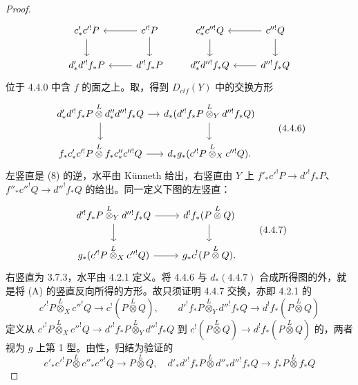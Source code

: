 \begin{proof}
\[\begin{tikzcd}c'_*c'^!P\arrow[d]&c'^!P\arrow[l]\arrow[d]\\ d'_*d'^!f_*P&d'^!f_*P\arrow[l]\end{tikzcd}\qquad\begin{tikzcd}c''_*c''^!Q\arrow[d]&c''^!Q\arrow[l]\arrow[d]\\ d''_*d''^!f_*Q&d''^!f_*Q\arrow[l]\end{tikzcd}\]
位于 4.4.0 中含 $f$ 的面之上。取，得到 $D_{ctf}(Y)$ 中的交换方形
\[\begin{tikzcd}[column sep=small]
d'_*d'^!f_*P\mathbin{\overset L\otimes}d''_*d''^!f_*Q\arrow[r]\arrow[d]&d_*(d'^!f_*P\mathbin{\overset L\otimes}_Yd''^!f_*Q)\arrow[d]\\ f_*c'_*c'^!P\mathbin{\overset L\otimes}f_*c''_*c''^!Q\arrow[r]&d_*g_*(c'^!P\mathbin{\overset L\otimes}_Xc''^!Q).
\end{tikzcd}\tag{4.4.6}\]
左竖直是 (8) 的逆，水平由 Künneth 给出，右竖直由 $Y$ 上 $f'_*c'^!P\to d'^!f_*P$、$f''_*c''^!Q\to d''^!f_*Q$ 的给出。同一定义下图的左竖直：
\[\begin{tikzcd}
d'^!f_*P\mathbin{\overset L\otimes}_Yd''^!f_*Q\arrow[r]\arrow[d]&d^!f_*(P\mathbin{\overset L\otimes}Q)\arrow[d]\\g_*(c'^!P\mathbin{\overset L\otimes}_Xc''^!Q)\arrow[r]&g_*c^!(P\mathbin{\overset L\otimes}Q).
\end{tikzcd}\tag{4.4.7}\]
右竖直为 3.7.3，水平由 4.2.1 定义。将 4.4.6 与 $d_*(4.4.7)$ 合成所得图的外，就是将 (A) 的竖直反向所得的方形。故只须证明 4.4.7 交换，亦即 4.2.1 的
\[c'^!P\mathbin{\overset L\otimes}_Xc''^!Q\to c^!(P\mathbin{\overset L\otimes}Q),\qquad d'^!f_*P\mathbin{\overset L\otimes}_Yd''^!f_*Q\to d^!f_*(P\mathbin{\overset L\otimes}Q)\]
定义从 $c'^!P\mathbin{\overset L\otimes}_Xc''^!Q\to d'^!f_*P\mathbin{\overset L\otimes}_Yd''^!f_*Q$ 到 $c^!(P\mathbin{\overset L\otimes}Q)\to d^!f_*(P\mathbin{\overset L\otimes}Q)$ 的，两者视为 $g$ 上第 1 型。由性，归结为验证的
\[c'_*c'^!P\mathbin{\overset L\otimes}c''_*c''^!Q\to P\mathbin{\overset L\otimes}Q,\quad d'_*d'^!f_*P\mathbin{\overset L\otimes}d''_*d''^!f_*Q\to f_*P\mathbin{\overset L\otimes}f_*Q\]

\end{proof}
